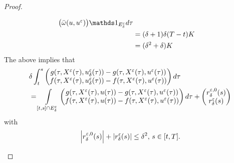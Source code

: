 \begin{proof}
\begin{asparaenum}
\begin{align*}
{\begin{pmatrix}
                    \Bar{\omega}(u, u^{\veps})
                \end{pmatrix}} \ind_{E_{\delta}^{\veps}} d\tau \\
            &= (\delta + 1)\delta (T-t)K \\
            &= (\delta ^{2} + \delta)K
        \end{align*}
        The above implies that
        \begin{align*}
            &\delta \int_{t}^{s} %
            \begin{pmatrix}
                g(\tau, X^{\veps}(\tau), u_{\delta}^{\veps}(\tau)) - g(\tau, X^{\veps}(\tau), u^{\veps}(\tau)) \\
                f(\tau, X^{\veps}(\tau), u_{\delta}^{\veps}(\tau)) - f(\tau, X^{\veps}(\tau), u^{\veps}(\tau)) 
            \end{pmatrix} d\tau \\
            &= \int\limits_{[t,s]\cap E_{\delta}^{\veps}} %
                \begin{pmatrix}
                    g(\tau, X^{\veps}(\tau), u(\tau)) - g(\tau, X^{\veps}(\tau), u^{\veps}(\tau)) \\
                    f(\tau, X^{\veps}(\tau), u(\tau)) - f(\tau, X^{\veps}(\tau), u^{\veps}(\tau)) 
                \end{pmatrix} d\tau + %
                \begin{pmatrix}
                    r_{\delta}^{\veps, 0}(s) \\
                    r_{\delta}^{\veps}(s)
                \end{pmatrix}
        \end{align*}
        with 
        \begin{equation*}
            \left\lvert r_{\delta}^{\varepsilon, 0}(s)\right\rvert + \left\lvert r_{\delta}^{\varepsilon}(s)\right\rvert \leq \delta^2, \, s\in[t,T].
        \end{equation*}
        

\end{asparaenum}
\end{proof}
